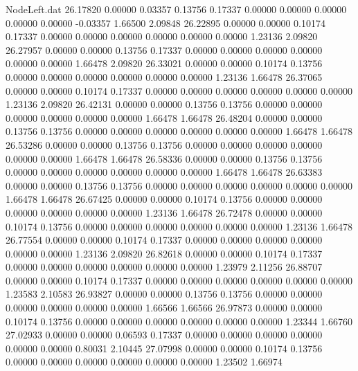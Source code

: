 \begin{filecontents}{NodeLeft.dat}
  26.17820    0.00000    0.03357     0.13756    0.17337    0.00000    0.00000    0.00000    0.00000    0.00000   -0.03357    1.66500    2.09848
  26.22895    0.00000    0.00000     0.10174    0.17337    0.00000    0.00000    0.00000    0.00000    0.00000    0.00000    1.23136    2.09820
  26.27957    0.00000    0.00000     0.13756    0.17337    0.00000    0.00000    0.00000    0.00000    0.00000    0.00000    1.66478    2.09820
  26.33021    0.00000    0.00000     0.10174    0.13756    0.00000    0.00000    0.00000    0.00000    0.00000    0.00000    1.23136    1.66478
  26.37065    0.00000    0.00000     0.10174    0.17337    0.00000    0.00000    0.00000    0.00000    0.00000    0.00000    1.23136    2.09820
  26.42131    0.00000    0.00000     0.13756    0.13756    0.00000    0.00000    0.00000    0.00000    0.00000    0.00000    1.66478    1.66478
  26.48204    0.00000    0.00000     0.13756    0.13756    0.00000    0.00000    0.00000    0.00000    0.00000    0.00000    1.66478    1.66478
  26.53286    0.00000    0.00000     0.13756    0.13756    0.00000    0.00000    0.00000    0.00000    0.00000    0.00000    1.66478    1.66478
  26.58336    0.00000    0.00000     0.13756    0.13756    0.00000    0.00000    0.00000    0.00000    0.00000    0.00000    1.66478    1.66478
  26.63383    0.00000    0.00000     0.13756    0.13756    0.00000    0.00000    0.00000    0.00000    0.00000    0.00000    1.66478    1.66478
  26.67425    0.00000    0.00000     0.10174    0.13756    0.00000    0.00000    0.00000    0.00000    0.00000    0.00000    1.23136    1.66478
  26.72478    0.00000    0.00000     0.10174    0.13756    0.00000    0.00000    0.00000    0.00000    0.00000    0.00000    1.23136    1.66478
  26.77554    0.00000    0.00000     0.10174    0.17337    0.00000    0.00000    0.00000    0.00000    0.00000    0.00000    1.23136    2.09820
  26.82618    0.00000    0.00000     0.10174    0.17337    0.00000    0.00000    0.00000    0.00000    0.00000    0.00000    1.23979    2.11256
  26.88707    0.00000    0.00000     0.10174    0.17337    0.00000    0.00000    0.00000    0.00000    0.00000    0.00000    1.23583    2.10583
  26.93827    0.00000    0.00000     0.13756    0.13756    0.00000    0.00000    0.00000    0.00000    0.00000    0.00000    1.66566    1.66566
  26.97873    0.00000    0.00000     0.10174    0.13756    0.00000    0.00000    0.00000    0.00000    0.00000    0.00000    1.23344    1.66760
  27.02933    0.00000    0.00000     0.06593    0.17337    0.00000    0.00000    0.00000    0.00000    0.00000    0.00000    0.80031    2.10445
  27.07998    0.00000    0.00000     0.10174    0.13756    0.00000    0.00000    0.00000    0.00000    0.00000    0.00000    1.23502    1.66974

\end{filecontents}
